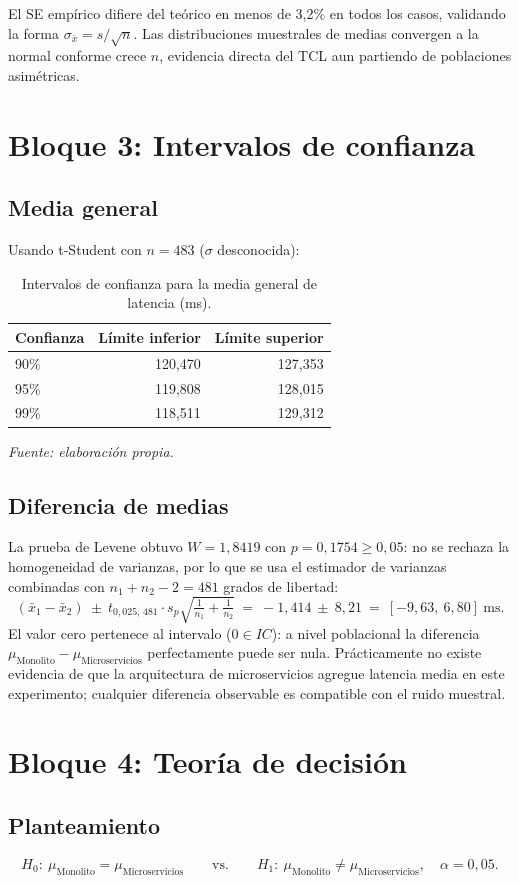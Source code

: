 \documentclass[12pt,a4paper]{article}
\newcommand{\fuentep}{\par\vspace{2pt}\footnotesize\textit{Fuente: elaboración propia.}\par}
\begin{document}
El SE empírico difiere del teórico en menos de 3,2\% en todos los casos, validando la forma $\sigma_{\bar x}=s/\sqrt{n}$. Las distribuciones muestrales de medias convergen a la normal conforme crece $n$, evidencia directa del TCL aun partiendo de poblaciones asimétricas.

\section{Bloque 3: Intervalos de confianza}
\subsection{Media general}
Usando t-Student con $n=483$ ($\sigma$ desconocida):
\begin{table}[htbp]
\centering
\caption{Intervalos de confianza para la media general de latencia (ms).}
\begin{tabular}{lrr}
\toprule
Confianza & Límite inferior & Límite superior \\
\midrule
90\% & 120,470 & 127,353 \\
95\% & 119,808 & 128,015 \\
99\% & 118,511 & 129,312 \\
\bottomrule
\end{tabular}
\fuentep
\end{table}

\subsection{Diferencia de medias}
La prueba de Levene obtuvo $W=1{,}8419$ con $p=0{,}1754\geq0{,}05$: no se rechaza la homogeneidad de varianzas, por lo que se usa el estimador de varianzas combinadas con $n_1+n_2-2=481$ grados de libertad:
\[
(\bar x_1-\bar x_2)\ \pm\ t_{0{,}025,\,481}\cdot s_p\sqrt{\tfrac{1}{n_1}+\tfrac{1}{n_2}}
\ =\ -1{,}414 \ \pm\ 8{,}21 \ =\ [-9{,}63,\ 6{,}80]\ \text{ms}.
\]
El valor cero pertenece al intervalo ($0\in IC$): a nivel poblacional la diferencia $\mu_{\text{Monolito}}-\mu_{\text{Microservicios}}$ perfectamente puede ser nula. Prácticamente no existe evidencia de que la arquitectura de microservicios agregue latencia media en este experimento; cualquier diferencia observable es compatible con el ruido muestral.

\section{Bloque 4: Teoría de decisión}
\subsection{Planteamiento}
\[
H_0:\ \mu_{\text{Monolito}}=\mu_{\text{Microservicios}}
\qquad\text{vs.}\qquad
H_1:\ \mu_{\text{Monolito}}\neq\mu_{\text{Microservicios}},
\quad \alpha=0{,}05.
\]
\end{document}
